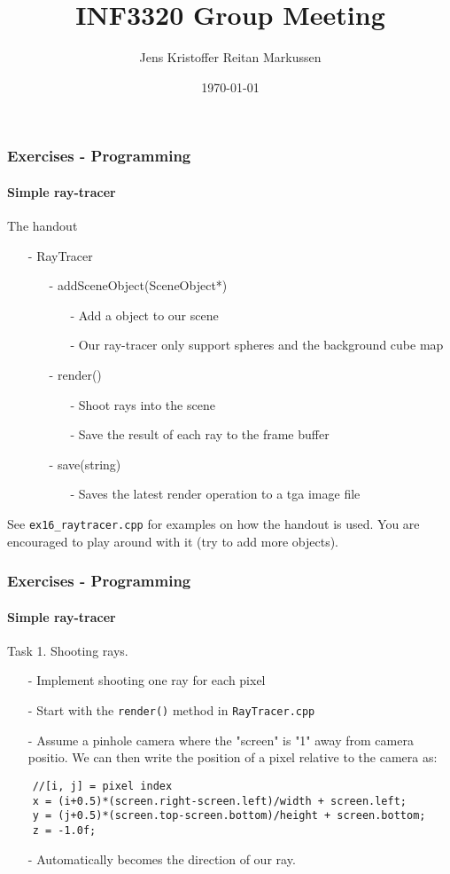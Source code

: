 \documentclass[8pt]{beamer}
\title{INF3320 Group Meeting}
\author{Jens Kristoffer Reitan Markussen}
\date{\today}
\begin{document}

	\begin{frame}[fragile]
	\frametitle{Exercises - Programming}
	\framesubtitle{Simple ray-tracer}
	The handout
	\begin{enumerate}
	\item[-] RayTracer
	\begin{enumerate}
	\item[-] addSceneObject(SceneObject*)
	\begin{enumerate}
	\item[-] Add a object to our scene
	\item[-] Our ray-tracer only support spheres and the background cube map
	\end{enumerate}
	\item[-] render() 
	\begin{enumerate}
	\item[-] Shoot rays into the scene
	\item[-] Save the result of each ray to the frame buffer
	\end{enumerate}
	\item[-] save(string)
	\begin{enumerate}
	\item[-] Saves the latest render operation to a tga image file
	\end{enumerate}
	\end{enumerate}
	\end{enumerate}
	See \verb|ex16_raytracer.cpp| for examples on how the handout is used. You are encouraged to play around with it (try to add more objects).

	\end{frame}
	
	\begin{frame}[fragile]
	\frametitle{Exercises - Programming}
	\framesubtitle{Simple ray-tracer}
	Task 1. Shooting rays.
	\begin{enumerate}
	\item[-] Implement shooting one ray for each pixel
	\item[-] Start with the \verb|render()| method in \verb|RayTracer.cpp|
	\item[-] Assume a pinhole camera where the "screen" is "1" away from camera positio. We can then write the position of a pixel relative to the camera as:
	\end{enumerate}
	\begin{lstlisting}
	//[i, j] = pixel index
	x = (i+0.5)*(screen.right-screen.left)/width + screen.left;
	y = (j+0.5)*(screen.top-screen.bottom)/height + screen.bottom; 
	z = -1.0f;
	\end{lstlisting}
	\begin{enumerate}
	\item[-] Automatically becomes the direction of our ray.
	\end{enumerate}
	
	\end{frame}
	
\end{document}
